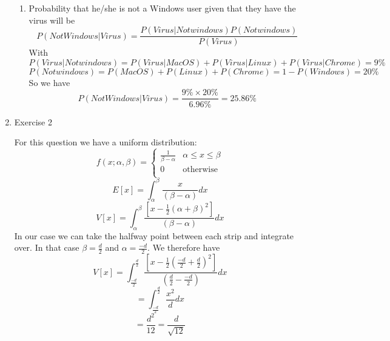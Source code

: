 \documentclass[12pt]{article}
\begin{document}
\begin{enumerate}
\begin{enumerate}
    \item Probability that he/she is not a Windows user given that they have the virus will be 
    $$ P(Not Windows | Virus) = \frac{P(Virus | Not windows)P(Not windows)}{P(Virus)} $$
    With 
    $$ P(Virus | Not windows) = P(Virus | MacOS) + P(Virus | Linux) + P(Virus | Chrome) = 9\%$$
    $$ P(Not windows) = P(MacOS) + P(Linux) + P(Chrome) = 1- P(Windows) = 20\%$$
    So we have 
    $$ P(Not Windows | Virus) = \frac{9\% \times 20\%}{6.96\%} = 25.86\% $$
    
\end{enumerate}

\item Exercise 2

For this question we have a uniform distribution:
$$   f(x;\alpha, \beta) = 
\begin{cases}
    \frac{1}{\beta-\alpha}&  \alpha \leq x \leq \beta\\
    0&\text{otherwise}\\
    \end{cases} $$
$$ E[x] = \int_\alpha^\beta \frac{x}{(\beta-\alpha)} dx $$
$$ V[x] = \int_\alpha^\beta \frac{[x-\frac{1}{2}(\alpha+\beta)^2  ]}{(\beta-\alpha)} dx$$
In our case we can take the halfway point between each strip and integrate over. In that case $\beta = \frac{d}{2}$ and $\alpha = \frac{-d}{2}$. We therefore have
$$ V[x] = \int_\frac{-d}{2}^\frac{d}{2} \frac{[x-\frac{1}{2}(\frac{-d}{2}+\frac{d}{2})^2  ]}{(\frac{d}{2}-\frac{-d}{2})} dx$$
$$ = \int_\frac{-d}{2}^\frac{d}{2} \frac{x^2}{d} dx $$
$$ = \frac{d^2}{12} = \frac{d}{\sqrt{12}} $$





\end{enumerate}
\end{document}
